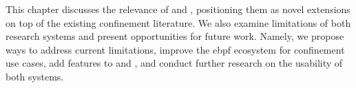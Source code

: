 This chapter discusses the relevance of \bpfbox{} and \bpfcontain{}, positioning them as
novel extensions on top of the existing confinement literature. We also examine
limitations of both research systems and present opportunities for future work. Namely, we
propose ways to address current limitations, improve the \gls{ebpf} ecosystem for
confinement use cases, add features to \bpfbox{} and \bpfcontain{}, and conduct further
research on the usability of both systems.


